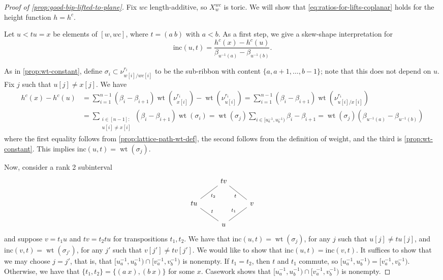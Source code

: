 \documentclass[11pt]{amsart}
\theoremstyle{definition}
\DeclareMathOperator{\wt}{wt}
\def\hgt{h}
\def\hc{\hgt^c}
\def\skew{\nu}
\def\pt{\beta}
\def\steep{{\mathrm {inc}}}
\begin{document}
\begin{proof}[Proof of \cref{prop:good-bip-lifted-to-plane}]
	Fix $wc$ length-additive, so $X_w^{wc}$ is toric. We will show that \eqref{eq:ratios-for-lifts-coplanar} holds for the height function $\hgt=\hc$. 
	
	Let $u < t u=x$ be elements of $[w,wc]$, where $t = (a~b)$ with $a<b$. As a first step, we give a skew-shape interpretation for 
	\[\steep(u, t) = \frac{\hc(x)-\hc(u)}{\pt_{u^{-1}(a)}-\pt_{u^{-1}(b)}}.\]
	
	As in \cref{prop:wt-constant}, define $\sigma_i\subset \skew_{w[i]/wc[i]}^{r_i}$ to be the sub-ribbon with content $\{a, a+1, \dots, b-1\}$; note that this does not depend on $u$.  Fix $j$ such that $u[j] \neq x[j]$. We have
	\begin{align*}\hc(x)-\hc(u )&=\sum_{i=1}^{n-1} (\pt_i - \pt_{i+1}) \wt(\skew_{x[i]}^{r_i})-\wt(\skew_{u[i]}^{r_i})= \sum_{i=1}^{n-1}(\pt_i - \pt_{i+1}) \wt(\skew_{u[i]/x[i]}^{r_i})\\
		&= \sum_{\substack{i \in [n-1]:\\u[i] \neq x[i]}} (\pt_i - \pt_{i+1}) \wt(\sigma_i) = \wt(\sigma_j) \sum_{i \in [u^{-1}_a, u^{-1}_b)}\pt_i - \pt_{i+1} = \wt(\sigma_j) (\pt_{u^{-1}(a)}-\pt_{u^{-1}(b)})\end{align*}
	where the first equality follows from \cref{prop:lattice-path-wt-def}, the second follows from the definition of weight, and the third is \cref{prop:wt-constant}. This implies $\steep(u,t)=\wt(\sigma_j)$. 
	
	Now, consider a rank 2 subinterval 
\[\begin{tikzcd}
	& tv \\
	tu && v \\
	& u
	\arrow["{t_2}"', no head, from=2-1, to=1-2]
	\arrow["t", no head, from=2-3, to=1-2]
	\arrow["t"', no head, from=3-2, to=2-1]
	\arrow["{t_1}", no head, from=3-2, to=2-3]
\end{tikzcd}\]
and suppose $v=t_1 u$ and $tv=t_2tu$ for transpositions $t_1, t_2$. We have that $\steep(u,t)=\wt(\sigma_j)$, for any $j$ such that $u[j] \neq tu[j]$, and $\steep(v,t)=\wt(\sigma_{j'})$, for any $j'$ such that $v[j'] \neq tv[j']$. We would like to show that $\steep(u,t)=\steep(v,t)$. It suffices to show that we may choose $j=j'$, that is, that $[u_a^{-1}, u_b^{-1}) \cap [v_a^{-1}, v_b^{-1})$ is nonempty. If $t_1=t_2$, then $t$ and $t_1$ commute, so $[u_a^{-1}, u_b^{-1}) = [v_a^{-1}, v_b^{-1})$. Otherwise, we have that $\{t_1, t_2\} =\{ (a~x),(b~x)\}$ for some $x$. Casework shows that $[u_a^{-1}, u_b^{-1}) \cap [v_a^{-1}, v_b^{-1})$ is nonempty.
	
	
	
\end{proof}
\end{document}

